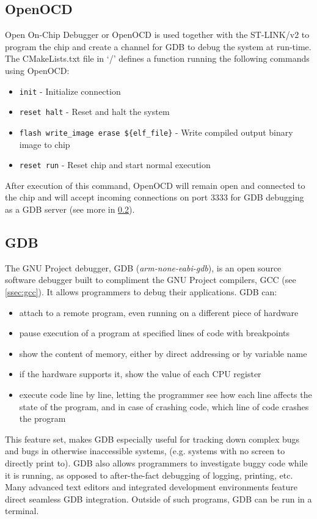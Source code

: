 \subsection{OpenOCD}
\label{ssec:openocd}
Open On-Chip Debugger or OpenOCD\cite{openocd} is used together with
the ST-LINK/v2 to program the chip and create a channel for GDB to debug the system at run-time.
The CMakeLists.txt file in `/' defines a function running the following commands using OpenOCD:

\begin{itemize}
	\item \texttt{init} - Initialize connection
	\item \texttt{reset halt} - Reset and halt the system
	\item \texttt{flash write\_image erase \$\{elf\_file\}} - Write compiled output binary image to chip
	\item \texttt{reset run} - Reset chip and start normal execution
\end{itemize}

After execution of this command, OpenOCD will remain open and connected to the
chip and will accept incoming connections on port 3333 for
GDB debugging as a GDB server (see more in \ref{ssec:gdb}).


\subsection{GDB}
\label{ssec:gdb}
The GNU Project debugger\cite{gdb}, GDB (\textit{arm-none-eabi-gdb}), is an open source software debugger
built to compliment the GNU Project compilers, GCC (see \ref{ssec:gcc}). It
allows programmers to debug their applications.
GDB can:
\begin{itemize}
	\item attach to a remote program, even running on a different piece of
	hardware
	\item pause execution of a program at specified lines of code with
	breakpoints
	\item show the content of memory, either by direct addressing or by
	variable name
	\item if the hardware supports it, show the value of each CPU register
	\item execute code line by line, letting the programmer see how each line
	affects the state of the program, and in case of crashing code, which line
	of code crashes the program
\end{itemize}
This feature set, makes GDB especially useful for tracking down complex bugs and
bugs in otherwise inaccessible systems, (e.g. systems with no screen to directly
print to). GDB also allows programmers to investigate buggy code while it is
running, as opposed to after-the-fact debugging of logging, printing, etc.
Many advanced text editors and integrated development environments feature
direct seamless GDB integration. Outside of such programs, GDB can be run in
a terminal.

